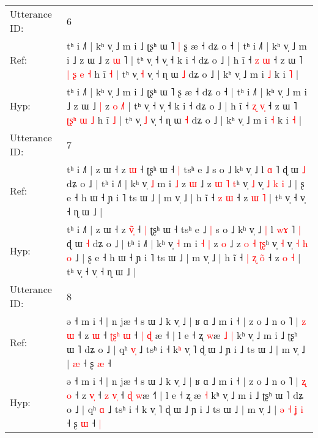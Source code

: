 \documentclass[10pt]{article}
\DeclareRobustCommand{\hl}[1]{{\textcolor{red}{#1}}}
\begin{document}
\begin{longtable}{ll}
\midrule
Utterance ID: & 6 \\
Ref: & tʰ i ˩˥ | kʰ v̩ ˩ m i ˩ ʈʂʰ ɯ ˥\hl{ }\hl{|} ʂ æ ˧ dʑ o ˧ | tʰ i ˩˥ | kʰ v̩ ˩ m i ˩ z ɯ ˩\hl{}\hl{} z \hl{ɯ} \hl{}˥ | tʰ v̩ ˧ v̩ ˧ k i ˧ dʑ o ˩ | h ĩ ˧ \hl{z} \hl{}\hl{ɯ} ˧ z ɯ ˥ \hl{|}\hl{ }\hl{ʂ} \hl{e} \hl{˧} h ĩ \hl{˧} | tʰ v̩ \hl{˧} v̩ ˧ ɳ ɯ \hl{˩} dʑ o ˩ | kʰ v̩ ˩ m i \hl{˩} k i \hl{˥} |
 \\
Hyp: & tʰ i ˩˥ | kʰ v̩ ˩ m i ˩ ʈʂʰ ɯ ˥\hl{}\hl{} ʂ æ ˧ dʑ o ˧ | tʰ i ˩˥ | kʰ v̩ ˩ m i ˩ z ɯ ˩\hl{ }\hl{|} z \hl{o} \hl{˩}˥ | tʰ v̩ ˧ v̩ ˧ k i ˧ dʑ o ˩ | h ĩ ˧ \hl{ʐ} \hl{v}\hl{̩} ˧ z ɯ ˥ \hl{ʈ}\hl{ʂ}\hl{ʰ} \hl{ɯ} \hl{˩} h ĩ \hl{˩} | tʰ v̩ \hl{˩} v̩ ˧ ɳ ɯ \hl{˧} dʑ o ˩ | kʰ v̩ ˩ m i \hl{˧} k i \hl{˧} |
 \\
\midrule
Utterance ID: & 7 \\
Ref: & tʰ i ˩˥ | z ɯ ˧ z \hl{}\hl{}\hl{ɯ} ˧\hl{}\hl{} ʈʂʰ ɯ ˧\hl{ }\hl{|} tsʰ e ˩\hl{}\hl{} s o ˩ kʰ v̩ ˩\hl{}\hl{} l \hl{}\hl{ɑ} ˥\hl{}\hl{} ɖ ɯ \hl{˩} dʑ o ˩ | tʰ i ˩˥ | kʰ v̩ \hl{˩} m i\hl{}\hl{} \hl{˩} z \hl{ɯ} ˩ z \hl{ɯ} \hl{˥} \hl{}\hl{t}ʰ v̩ \hl{˩} v̩ \hl{˩} \hl{k} \hl{i} ˩ | ʂ e ˧ h ɯ ˧ ɲ i ˥ ts ɯ ˩ | m v̩ ˩ | h ĩ ˧\hl{}\hl{} \hl{z} \hl{}\hl{ɯ} ˧ z \hl{ɯ} \hl{˥} | tʰ v̩ ˧ v̩ ˧ ɳ ɯ ˩ |
 \\
Hyp: & tʰ i ˩˥ | z ɯ ˧ z \hl{v}\hl{̃}\hl{̩} ˧\hl{ }\hl{|} ʈʂʰ ɯ ˧\hl{}\hl{} tsʰ e ˩\hl{ }\hl{|} s o ˩ kʰ v̩ ˩\hl{ }\hl{|} l \hl{w}\hl{ɤ} ˥\hl{ }\hl{|} ɖ ɯ \hl{˧} dʑ o ˩ | tʰ i ˩˥ | kʰ v̩ \hl{˧} m i\hl{ }\hl{˧} \hl{|} z \hl{o} ˩ z \hl{o} \hl{˧} \hl{ʈ}\hl{ʂ}ʰ v̩ \hl{˧} v̩ \hl{˧} \hl{h} \hl{o} ˩ | ʂ e ˧ h ɯ ˧ ɲ i ˥ ts ɯ ˩ | m v̩ ˩ | h ĩ ˧\hl{ }\hl{|} \hl{ʐ} \hl{o}\hl{̃} ˧ z \hl{o} \hl{˧} | tʰ v̩ ˧ v̩ ˧ ɳ ɯ ˩ |
 \\
\midrule
Utterance ID: & 8 \\
Ref: & ə ˧ m i ˧ | n jæ ˧ s ɯ ˩ k v̩ ˩ | ʁ ɑ ˩ m i ˧ | z o ˩ n o ˥ | \hl{z} \hl{ɯ} ˧ z \hl{}\hl{ɯ} ˧ \hl{ʈ}\hl{ʂ}\hl{ʰ}\hl{ }\hl{ɯ} ˧ \hl{|} \hl{ɖ}\hl{ }æ ˧\hl{} | l e ˧ ʐ \hl{w}æ\hl{ }\hl{˩} \hl{|} kʰ v̩ ˩ m i ˩ ʈʂʰ ɯ ˥ dʑ o ˩ | qʰ \hl{v}\hl{̩} ˩ tsʰ i ˧ k\hl{ʰ} v̩ ˥ ɖ ɯ ˩ ɲ i ˩ ts ɯ ˩ | m v̩ ˩ |\hl{}\hl{}\hl{}\hl{}\hl{}\hl{} \hl{æ} ˧ ʂ \hl{æ} ˧\hl{}\hl{}
 \\
Hyp: & ə ˧ m i ˧ | n jæ ˧ s ɯ ˩ k v̩ ˩ | ʁ ɑ ˩ m i ˧ | z o ˩ n o ˥ | \hl{ʐ} \hl{o} ˧ z \hl{v}\hl{̩} ˧ \hl{}\hl{z}\hl{ }\hl{v}\hl{̩} ˧ \hl{ɖ} \hl{}\hl{w}æ ˧\hl{˥} | l e ˧ ʐ \hl{}æ\hl{}\hl{} \hl{˧} kʰ v̩ ˩ m i ˩ ʈʂʰ ɯ ˥ dʑ o ˩ | qʰ \hl{}\hl{ɑ} ˩ tsʰ i ˧ k\hl{} v̩ ˥ ɖ ɯ ˩ ɲ i ˩ ts ɯ ˩ | m v̩ ˩ |\hl{ }\hl{ə}\hl{ }\hl{˧}\hl{ }\hl{ʝ} \hl{i} ˧ ʂ \hl{ɯ} ˧\hl{ }\hl{|}
 \\

\end{longtable}
\end{document}
